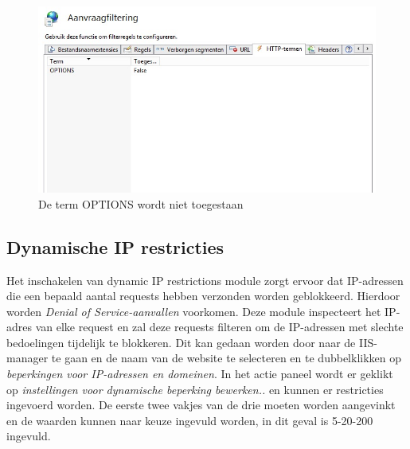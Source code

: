 \documentclass[pdftex,a4paper,12pt]{report}
\begin{document}
\begin{figure}[H]
\begin{center}
\includegraphics[scale=0.60]{img/IIS_Options}
\end{center}
\caption{De term OPTIONS wordt niet toegestaan}
\label{img:IISOptions}
\end{figure}

\subsection{Dynamische IP restricties}
Het inschakelen van dynamic IP restrictions module zorgt ervoor dat IP-adressen die een bepaald aantal requests hebben verzonden worden geblokkeerd. Hierdoor worden \textit{Denial of Service-aanvallen} voorkomen. Deze module inspecteert het IP-adres van elke request en zal deze requests filteren om de IP-adressen met slechte bedoelingen tijdelijk te blokkeren. Dit kan gedaan worden door naar de IIS-manager te gaan en de naam van de website te selecteren en te dubbelklikken op \textit{beperkingen voor IP-adressen en domeinen}. In het actie paneel wordt er geklikt op \textit{instellingen voor dynamische beperking bewerken.. }en kunnen er restricties ingevoerd worden. De eerste twee vakjes van de drie moeten worden aangevinkt en de waarden kunnen naar keuze ingevuld worden, in dit geval is 5-20-200 ingevuld. \citep{Darmanin2014}
\end{document}
